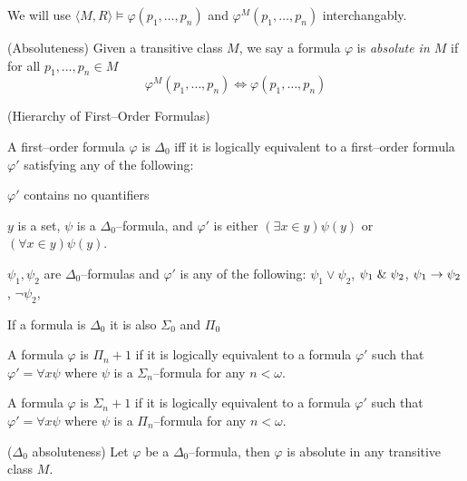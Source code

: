 We will use $\langle M, R \rangle \models \varphi(p_1, \ldots, p_n)$ and $\varphi^M(p_1, \ldots, p_n)$ interchangably.

\begin{definition}{(Absoluteness)}
Given a transitive class $M$, we say a formula $\varphi$ is \emph{absolute in $M$} if for all $p_1, \ldots, p_n \in M$
\begin{equation}
\varphi^M(p_1, \ldots, p_n) \iff \varphi(p_1, \ldots, p_n)
\end{equation}
\end{definition}

\begin{definition}{(Hierarchy of First–Order Formulas)}\\
\bce[(I)]
\item A first–order formula $\varphi$ is $\Delta_0$ iff it is logically equivalent to a first–order formula $\varphi'$ satisfying any of the following:
\bce[(i)]
\item $\varphi'$ contains no quantifiers
\item $y$ is a set, $\psi$ is a $\Delta_0$–formula, and $\varphi'$ is either $(\exists x \in y)\psi(y)$ or $(\forall x \in y)\psi(y)$.
\item $\psi_1, \psi_2$ are $\Delta_0$–formulas and $\varphi'$ is any of the following: $\psi_1 \lor \psi_2$, $\psi_1 \mathrel{\&} \psi_2$, $\psi_1 \rightarrow \psi_2$, $\neg \psi_2$, 
\ece
\item If a formula is $\Delta_0$ it is also $\Sigma_0$ and $\Pi_0$
\item A formula $\varphi$ is $\Pi_n+1$ if it is logically equivalent to a formula $\varphi'$ such that $\varphi' = \forall x \psi$ where $\psi$ is a $\Sigma_n$–formula for any $n < \omega$.
\item A formula $\varphi$ is $\Sigma_n+1$ if it is logically equivalent to a formula $\varphi'$ such that $\varphi' = \forall x \psi$ where $\psi$ is a $\Pi_n$–formula for any $n < \omega$.
\ece
\end{definition} %

\begin{lemma}{($\Delta_0$ absoluteness)}\label{lemma:delta_0_absoluteness}
Let $\varphi$ be a $\Delta_0$–formula, then $\varphi$ is absolute in any transitive class $M$.
\end{lemma}

